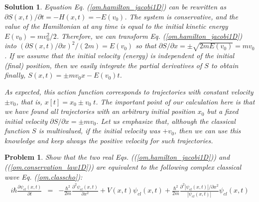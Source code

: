 \documentclass[onecolumn,nofootinbib, secnumarabic, amsmath, nobibnotes,11pt,aps,pra]{revtex4-1}
\newtheorem{problem}{Problem}
\newtheorem{solution}{Solution}
\newcommand{\pref}[1]{(\ref{#1})}
\newcommand{\eref}[1]{Eq. (\ref{#1})}
\begin{document}
\begin{solution}
Equation \eref{om.hamilton_jacobi1D} can be rewritten as ${\partial S(x,t)}/{\partial t} = -H(x,t) = -E(v_0)$. The system is conservative, and the value of the Hamiltonian at any time is equal to the initial kinetic energy $E(v_0) = m v_0^2/2$. Therefore, we can transform \eref{om.hamilton_jacobi1D} into $(\partial S(x,t)/\partial x)^2/(2 m) = E(v_0)$ so that $\partial S/\partial x = \pm \sqrt{2 m E(v_0)} = m v_0$. If we assume that the initial velocity (energy) is independent of the initial (final) position, then we easily integrate the partial derivatives of $S$ to obtain finally, $S(x,t) = \pm m v_0 x - E(v_0) t$.

As expected, this action function corresponds to trajectories with
constant velocity $\pm v_0$, that is, $x[t] = x_0 \pm v_0 \; t$. The
important point of our calculation here is that we have found all
trajectories with an arbitrary initial position $x_0$ but a fixed
initial velocity $\partial S/\partial x = \pm m v_0$. Let us
emphasize that, although the classical function $S$ is multivalued,
if the initial velocity was $ + v_0$, then we can use this knowledge  and keep always the positive velocity for such
trajectories.
\end{solution}

\begin{problem} \label{om.p3bis}
Show that the two real Eqs. (\pref{om.hamilton_jacobi1D}) and (\pref{om.conservation_law1D}) are equivalent to the following complex classical wave \eref{om.classcho}:
\begin{eqnarray}
\label{om.p.classcho}
i \hbar \frac{ \partial \psi_{cl}(x,t)} {\partial t} &=& -\frac {\hbar^2}{2m} \frac{ {\partial}^2 \psi_{cl}(x,t)} {\partial x^2} + V(x,t) \psi_{cl}(x,t)+ \frac {\hbar^{2}} {2 m} \frac { {\partial}^2 |\psi_{cl}(x,t)|/ \partial x^2}{|\psi_{cl}(x,t)|} \psi_{cl}(x,t)
\end{eqnarray}
\end{problem}
\end{document}
